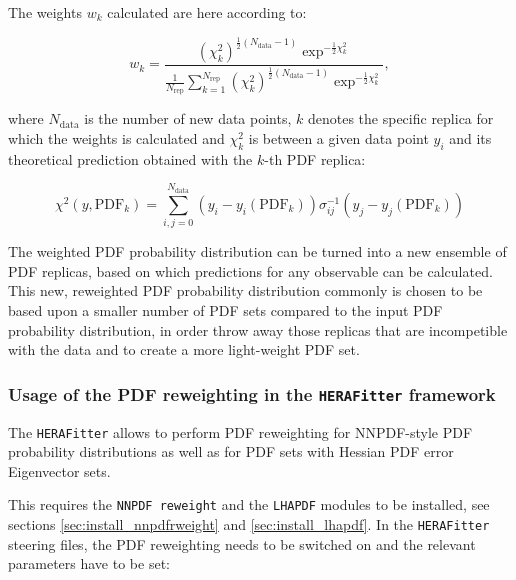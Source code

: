 \documentclass[11pt,a4paper]{article}
\newcommand\fitter{ \mbox{\tt HERAFitter} }
\begin{document}
The weights $w_k$ calculated are here according to:

\begin{equation}
 w_k = \frac{(\chi^2_k)^{\frac{1}{2} (N_{\mathrm{data}}-1) } \exp^{-\frac{1}{2}\chi^2_k}}{ \frac{1}{N_{\mathrm{rep}}} \sum^{N_{\mathrm{rep}}}_{k=1}(\chi^2_k)^{\frac{1}{2}(N_{\mathrm{data}}-1)} \exp^{-\frac{1}{2}\chi^2_k}  },
\end{equation}

where $N_{\mathrm{data}}$ is the number of new data points, $k$ denotes the specific replica for which the weights is calculated and $\chi^2_k$ is between a given data point $y_i$ and its theoretical prediction obtained with the $k$-th PDF replica:

\begin{equation}
 \chi^2 (y,\mathrm{PDF}_k) = \sum_{i,j=0}^{N_{\mathrm{data}}} (y_i - y_i(\mathrm{PDF}_k)) \sigma^{-1}_{ij} (y_j-y_j(\mathrm{PDF}_k))  
\end{equation}

The weighted PDF probability distribution can be turned into a new ensemble of PDF replicas, based on which predictions for any observable can be calculated. This new, reweighted PDF probability distribution commonly is chosen to be based upon a smaller number of PDF sets compared to the input PDF probability distribution, in order throw away those replicas that are incompetible with the data and to create a more light-weight PDF set. 


\subsubsection{Usage of the PDF reweighting in the \fitter framework}
 
The \fitter allows to perform PDF reweighting for NNPDF-style PDF probability distributions as well as for PDF sets with Hessian PDF error Eigenvector sets. 

This requires the {\tt NNPDF reweight} and the {\tt LHAPDF} modules to be installed, see sections \ref{sec:install_nnpdfrweight} and \ref{sec:install_lhapdf}. In the \fitter steering files, the PDF reweighting needs to be switched on and the relevant parameters have to be set: 
\end{document}
